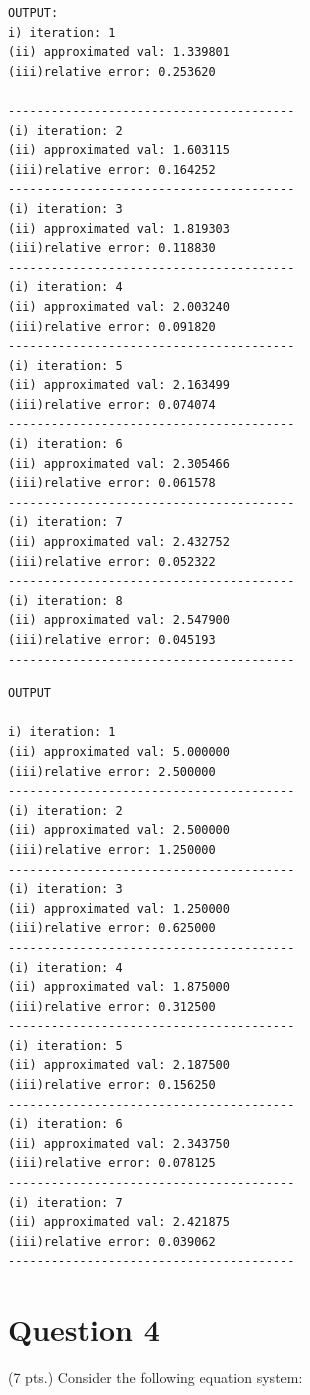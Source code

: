 \documentclass{article}
\begin{document}
\begin{verbatim}
OUTPUT:
i) iteration: 1
(ii) approximated val: 1.339801
(iii)relative error: 0.253620

----------------------------------------
(i) iteration: 2
(ii) approximated val: 1.603115
(iii)relative error: 0.164252
----------------------------------------
(i) iteration: 3
(ii) approximated val: 1.819303
(iii)relative error: 0.118830
----------------------------------------
(i) iteration: 4
(ii) approximated val: 2.003240
(iii)relative error: 0.091820
----------------------------------------
(i) iteration: 5
(ii) approximated val: 2.163499
(iii)relative error: 0.074074
----------------------------------------
(i) iteration: 6
(ii) approximated val: 2.305466
(iii)relative error: 0.061578
----------------------------------------
(i) iteration: 7
(ii) approximated val: 2.432752
(iii)relative error: 0.052322
----------------------------------------
(i) iteration: 8
(ii) approximated val: 2.547900
(iii)relative error: 0.045193
----------------------------------------
\end{verbatim}





\begin{verbatim}
OUTPUT

i) iteration: 1
(ii) approximated val: 5.000000
(iii)relative error: 2.500000
----------------------------------------
(i) iteration: 2
(ii) approximated val: 2.500000
(iii)relative error: 1.250000
----------------------------------------
(i) iteration: 3
(ii) approximated val: 1.250000
(iii)relative error: 0.625000
----------------------------------------
(i) iteration: 4
(ii) approximated val: 1.875000
(iii)relative error: 0.312500
----------------------------------------
(i) iteration: 5
(ii) approximated val: 2.187500
(iii)relative error: 0.156250
----------------------------------------
(i) iteration: 6
(ii) approximated val: 2.343750
(iii)relative error: 0.078125
----------------------------------------
(i) iteration: 7
(ii) approximated val: 2.421875
(iii)relative error: 0.039062
----------------------------------------
\end{verbatim}


\section*{Question 4} %
(7 pts.) Consider the following equation system:
\end{document}
